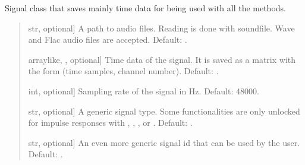 \documentclass[letterpaper,10pt,english]{sphinxmanual}
\begin{document}
\begin{fulllineitems}
\begin{fulllineitems}
\label{\detokenize{classes:dsptoolbox.classes.signal_class.Signal.__init__}}
\pysigstartsignatures
{}
\pysigstopsignatures
\sphinxAtStartPar
Signal class that saves mainly time data for being used with all the
methods.
\begin{quote}\begin{description}
\begin{description}
\sphinxlineitem{\sphinxstylestrong{path}}{[}str, optional{]}
\sphinxAtStartPar
A path to audio files. Reading is done with soundfile. Wave and
Flac audio files are accepted.
Default: .

\sphinxlineitem{\sphinxstylestrong{time\_data}}{[}array\sphinxhyphen{}like, , optional{]}
\sphinxAtStartPar
Time data of the signal. It is saved as a matrix with the form
(time samples, channel number). Default: .

\sphinxlineitem{\sphinxstylestrong{sampling\_rate\_hz}}{[}int, optional{]}
\sphinxAtStartPar
Sampling rate of the signal in Hz. Default: 48000.

\sphinxlineitem{\sphinxstylestrong{signal\_type}}{[}str, optional{]}
\sphinxAtStartPar
A generic signal type. Some functionalities are only unlocked for
impulse responses with , , ,  or .
Default: .

\sphinxlineitem{\sphinxstylestrong{signal\_id}}{[}str, optional{]}
\sphinxAtStartPar
An even more generic signal id that can be used by the user.
Default: .


\end{description}
\end{description}
\end{quote}
\end{fulllineitems}
\end{fulllineitems}
\end{document}
